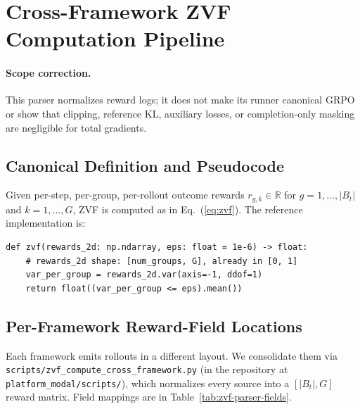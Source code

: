\providecommand{\artifactstatusword}{released}
\section{Cross-Framework ZVF Computation Pipeline}
\label{sec:appendix:zvf-pipeline}

\paragraph{Scope correction.} This parser normalizes reward logs; it does not
make its runner canonical GRPO or show that clipping, reference KL, auxiliary
losses, or completion-only masking are negligible for total gradients.

\subsection{Canonical Definition and Pseudocode}

Given per-step, per-group, per-rollout outcome rewards
$r_{g,k} \in \mathbb{R}$ for $g=1,\ldots,|B_t|$ and $k=1,\ldots,G$, ZVF
is computed as in Eq.~(\ref{eq:zvf}). The reference implementation is:
\begin{verbatim}
def zvf(rewards_2d: np.ndarray, eps: float = 1e-6) -> float:
    # rewards_2d shape: [num_groups, G], already in [0, 1]
    var_per_group = rewards_2d.var(axis=-1, ddof=1)
    return float((var_per_group <= eps).mean())
\end{verbatim}

\subsection{Per-Framework Reward-Field Locations}

Each framework emits rollouts in a different layout. We consolidate them
via \texttt{scripts/zvf\_compute\_cross\_framework.py} (in the repository at
\texttt{platform\_modal/scripts/}), which normalizes
every source into a $[|B_t|, G]$ reward matrix. Field mappings are in
Table~\ref{tab:zvf-parser-fields}.

